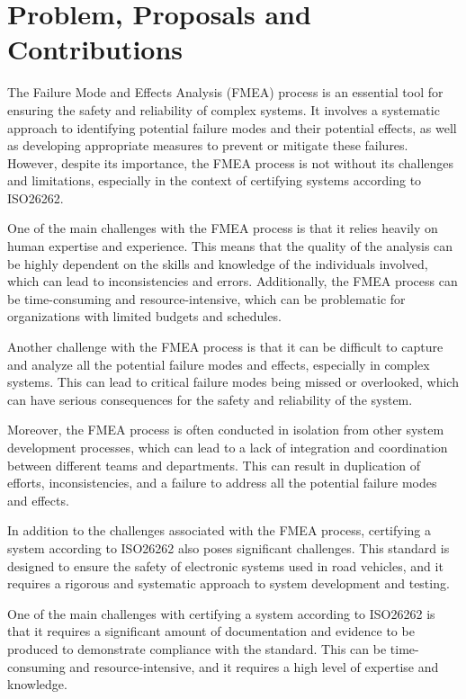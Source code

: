 \documentclass[./dissertation.tex]{subfiles}
\begin{document}
\newpage\null\thispagestyle{empty}\newpage
\chapter{Problem, Proposals and Contributions}
The Failure Mode and Effects Analysis (FMEA) process is an essential tool for ensuring the safety and reliability of complex systems. It involves a systematic approach to identifying potential failure modes and their potential effects, as well as developing appropriate measures to prevent or mitigate these failures. However, despite its importance, the FMEA process is not without its challenges and limitations, especially in the context of certifying systems according to ISO26262.

One of the main challenges with the FMEA process is that it relies heavily on human expertise and experience. This means that the quality of the analysis can be highly dependent on the skills and knowledge of the individuals involved, which can lead to inconsistencies and errors. Additionally, the FMEA process can be time-consuming and resource-intensive, which can be problematic for organizations with limited budgets and schedules.

Another challenge with the FMEA process is that it can be difficult to capture and analyze all the potential failure modes and effects, especially in complex systems. This can lead to critical failure modes being missed or overlooked, which can have serious consequences for the safety and reliability of the system.

Moreover, the FMEA process is often conducted in isolation from other system development processes, which can lead to a lack of integration and coordination between different teams and departments. This can result in duplication of efforts, inconsistencies, and a failure to address all the potential failure modes and effects.

In addition to the challenges associated with the FMEA process, certifying a system according to ISO26262 also poses significant challenges. This standard is designed to ensure the safety of electronic systems used in road vehicles, and it requires a rigorous and systematic approach to system development and testing.

One of the main challenges with certifying a system according to ISO26262 is that it requires a significant amount of documentation and evidence to be produced to demonstrate compliance with the standard. This can be time-consuming and resource-intensive, and it requires a high level of expertise and knowledge.
\end{document}
